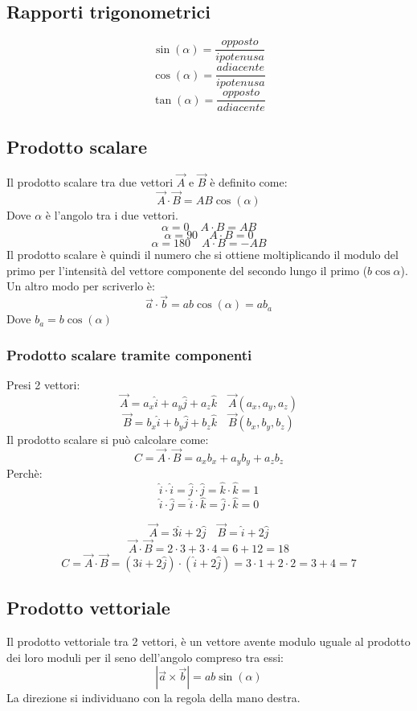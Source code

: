 \documentclass[a4paper]{article}
\theoremstyle{break}
\theoremstyle{break}
\theoremstyle{break}
\theoremstyle{break}
\begin{document}
\subsection{Rapporti trigonometrici}
\[
	\sin(\alpha) = \frac{opposto}{ipotenusa}
\]
\[
	\cos(\alpha) = \frac{adiacente}{ipotenusa}
\]
\[
	\tan(\alpha) = \frac{opposto}{adiacente}
\]

\subsection{Prodotto scalare}
Il prodotto scalare tra due vettori \( \vec{A} \) e \( \vec{B} \) è definito come:
\[
	\vec{A} \cdot \vec{B} = AB\cos(\alpha)
\]
Dove \( \alpha \) è l'angolo tra i due vettori.
\[
	\alpha = 0 \quad A \cdot B = AB
\]
\[
	\alpha = 90\quad A \cdot B = 0
\]
\[
	\alpha = 180\quad A \cdot B = -AB
\]
Il prodotto scalare è quindi il numero che si ottiene moltiplicando il modulo del primo per
l'intensità del vettore componente del secondo lungo il primo (\( b \cos{\alpha} \)). Un altro modo per scriverlo è:
\[
	\vec{a} \cdot \vec{b} = ab\cos(\alpha) = ab_a
\]
Dove \( b_a = b\cos(\alpha) \)

\subsubsection{Prodotto scalare tramite componenti}
Presi 2 vettori:
\[
	\vec{A} = a_x\hat{i} + a_y\hat{j} + a_z\hat{k} \quad \vec{A}(a_x,a_y,a_z)
\]
\[
	\vec{B} = b_x\hat{i} + b_y\hat{j} + b_z\hat{k} \quad \vec{B}(b_x,b_y,b_z)
\]
Il prodotto scalare si può calcolare come:
\[
	C = \vec{A} \cdot \vec{B} = a_xb_x + a_yb_y + a_zb_z
\]
Perchè:
\[
	\hat{i} \cdot \hat{i} = \hat{j} \cdot \hat{j} = \hat{k} \cdot \hat{k} = 1
\]
\[
	\hat{i} \cdot \hat{j} = \hat{i} \cdot \hat{k} = \hat{j} \cdot \hat{k} = 0
\]

\begin{figure}[H]
	\begin{example}
		\[
			\vec{A} = 3\hat{i} + 2\hat{j} \quad \vec{B} = \hat{i} + 2\hat{j}
		\]
		\[
			\vec{A} \cdot \vec{B} = 2\cdot3 + 3\cdot4 = 6 + 12 = 18
		\]
		\[
			C = \vec{A} \cdot \vec{B} = (3\hat{i} + 2\hat{j}) \cdot (\hat{i} + 2\hat{j}) = 3\cdot1 + 2\cdot2 = 3 + 4 = 7
		\]
	\end{example}
\end{figure}

\subsection{Prodotto vettoriale}
Il prodotto vettoriale tra 2 vettori, è un vettore avente modulo uguale al prodotto dei loro
moduli per il seno dell'angolo compreso tra essi:
\[
	|\vec{a} \times \vec{b}| = ab \sin(\alpha)
\]
La direzione si individuano con la regola della mano destra.
\end{document}
